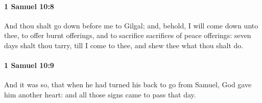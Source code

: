		\paragraph{1 Samuel 10:8} %
			\label{1SAMUEL-10-8}

			And thou shalt go down before me to Gilgal; and, behold, I will come down unto thee, to offer burnt offerings, and to sacrifice sacrifices of peace offerings: seven days shalt thou tarry, till I come to thee, and shew thee what thou shalt do.


		\paragraph{1 Samuel 10:9} %
			\label{1SAMUEL-10-9}

			And it was so, that when he had turned his back to go from Samuel, God gave him another heart: and all those signs came to pass that day.


